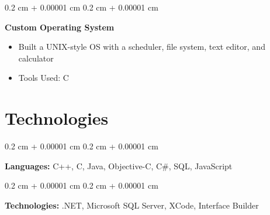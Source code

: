 \documentclass[10pt, letterpaper]{article}
\newenvironment{highlights}{
        \begin{itemize}[
            topsep=0.10 cm,
            parsep=0.10 cm,
            partopsep=0pt,
            itemsep=0pt,
            leftmargin=0.4 cm + 10pt
        ]
    }{
        \end{itemize}
    } %
\newenvironment{onecolentry}{
        \begin{adjustwidth}{
            0.2 cm + 0.00001 cm
        }{
            0.2 cm + 0.00001 cm
        }
    }{
        \end{adjustwidth}
    } %
\newenvironment{twocolentry}[2][]{
        \onecolentry
        \def\secondColumn{#2}
        \setcolumnwidth{\fill, 4.5 cm}
        \begin{paracol}{2}
    }{
        \switchcolumn \raggedleft \secondColumn
        \end{paracol}
        \endonecolentry
    } %
\begin{document}
            \vspace{0.2 cm}

            \begin{twocolentry}{
                2002
            }
                \textbf{Custom Operating System}
                \begin{highlights}
                    \item Built a UNIX-style OS with a scheduler, file system, text editor, and calculator
                    \item Tools Used: C
                \end{highlights}
            \end{twocolentry}



        
        \section{Technologies}



            
            \begin{onecolentry}
                \textbf{Languages:} C++, C, Java, Objective-C, C\#, SQL, JavaScript
            \end{onecolentry}

            \vspace{0.2 cm}

            \begin{onecolentry}
                \textbf{Technologies:} .NET, Microsoft SQL Server, XCode, Interface Builder
            \end{onecolentry}


        

    
\end{document}
